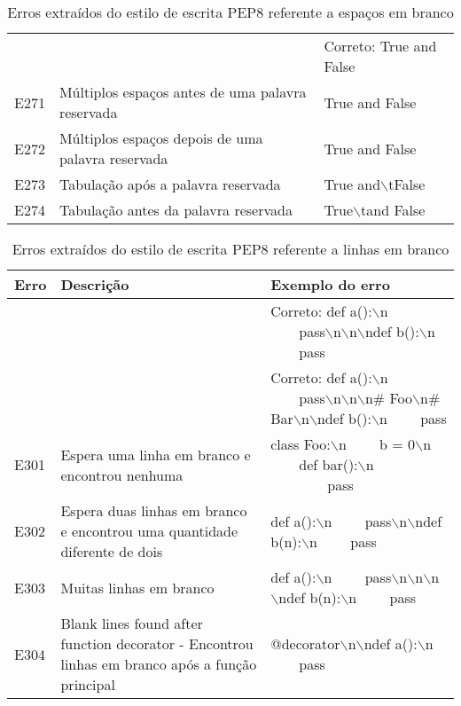 \begin{table}
\begin{tabularx}{\linewidth}{ |l|X|X| }
			& 
			&  \\ 
			\hline
			
			& 
			& Correto: True and False \\ 
			\hline
			E271 
			& Múltiplos espaços antes de uma palavra reservada
			& True and  False \\ 
			\hline
			E272 
			& Múltiplos espaços depois de uma palavra reservada 
			& True  and False \\ 
			\hline
			E273 
			& Tabulação após a palavra reservada 
			& True and$\backslash$tFalse \\ 
			\hline
			E274 
			& Tabulação antes da palavra reservada 
			& True$\backslash$tand False \\ 
			\hline
		\end{tabularx}
		\caption{Erros extraídos do estilo de escrita PEP8 referente a espaços em branco}
		\label{tab:pep8E200}
	\end{table}

	\begin{table}
		\scriptsize
		\begin{tabularx}{\linewidth}{ |l|X|X| }
			\hline
			\textbf{Erro}
			& \textbf{Descrição}
			& \textbf{Exemplo do erro} \\
			\hline
			
			& 
			& Correto: def a():$\backslash$n \ \ \ \ pass$\backslash$n$\backslash$n$\backslash$ndef b():$\backslash$n \ \ \ \ pass \\ 
			\hline
			
			& 
			& Correto: def a():$\backslash$n \ \ \ \ pass$\backslash$n$\backslash$n$\backslash$n\# Foo$\backslash$n\# Bar$\backslash$n$\backslash$ndef b():$\backslash$n \ \ \ \ pass \\ 
			\hline
			E301 
			& Espera uma linha em branco e encontrou nenhuma 
			& class Foo:$\backslash$n \ \ \ \ b = 0$\backslash$n \ \ \ \ def bar():$\backslash$n \ \ \ \  \ \ \ \ pass \\ 
			\hline
			E302 
			& Espera duas linhas em branco e encontrou uma quantidade diferente de dois 
			& def a():$\backslash$n \ \ \ \ pass$\backslash$n$\backslash$ndef b(n):$\backslash$n \ \ \ \ pass \\ 
			\hline
			E303 
			& Muitas linhas em branco 
			& def a():$\backslash$n \ \ \ \ pass$\backslash$n$\backslash$n$\backslash$n$\backslash$ndef b(n):$\backslash$n \ \ \ \ pass \\ 
			\hline
			E304 
			& Blank lines found after function decorator - Encontrou linhas em branco após a função principal 
			& @decorator$\backslash$n$\backslash$ndef a():$\backslash$n \ \ \ \ pass \\ 
			\hline
		\end{tabularx}
		\caption{Erros extraídos do estilo de escrita PEP8 referente a linhas em branco}
		\label{tab:pep8E300}
	\end{table}

